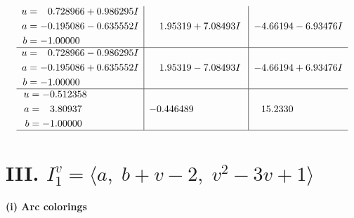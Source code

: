 \documentclass[1p]{elsarticle_modified}
\theoremstyle{definition}
\begin{document}
$$\begin{array}{c|c|c}
\begin{aligned}
u &= \phantom{-}0.728966 + 0.986295 I \\
a &= -0.195086 - 0.635552 I \\
b &= -1.00000\phantom{ +0.000000I}\end{aligned}
 & \phantom{-}1.95319 + 7.08493 I & -4.66194 - 6.93476 I \\ \hline\begin{aligned}
u &= \phantom{-}0.728966 - 0.986295 I \\
a &= -0.195086 + 0.635552 I \\
b &= -1.00000\phantom{ +0.000000I}\end{aligned}
 & \phantom{-}1.95319 - 7.08493 I & -4.66194 + 6.93476 I \\ \hline\begin{aligned}
u &= -0.512358\phantom{ +0.000000I} \\
a &= \phantom{-}3.80937\phantom{ +0.000000I} \\
b &= -1.00000\phantom{ +0.000000I}\end{aligned}
 & -0.446489\phantom{ +0.000000I} & \phantom{-}15.2330\phantom{ +0.000000I}\\
 \hline 
 \end{array}$$\newpage\newpage\renewcommand{\arraystretch}{1}
\centering \section*{III. $I^v_{1}= \langle a,\;b+v-2,\;v^2-3 v+1 \rangle$}
\flushleft \textbf{(i) Arc colorings}\\
\end{document}
